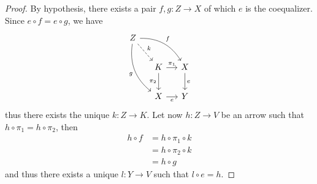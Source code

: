 \documentclass[runningheads,envcountsect]{lipics-v2021}
\newcommand{\cat}[1]{\ensuremath{\mathbf{#1}}}
\begin{document}

\begin{proof}
    By hypothesis, there exists a pair $f, g: Z \to X$ of which $e$ is the coequalizer. Since $e \circ f = e \circ g$, we have
    \[
        \begin{tikzcd}[row sep= 20, column sep = 13]
            Z \ar[drr, "f", bend left=30] \ar[ddr, "g"swap, bend right=30] \ar[dr, dashed, "k"] & & \\
            & K \ar[r, "{\pi_1}"] \ar[d, "{\pi_2}" swap] & X \ar[d, "e"] \\
            & X \ar[r, "e"swap] & Y
        \end{tikzcd}
    \]
    thus there exists the unique $k: Z \to K$. Let now $h: Z \to V$ be an arrow such that $h \circ \pi_1 = h \circ \pi_2$, then
    \begin{align*}
        h \circ f &= h \circ \pi_1 \circ k \\
                  &= h \circ \pi_2 \circ k \\
                  &= h \circ g
    \end{align*}
    and thus there exists a unique $l: Y \to V$ such that $l \circ e = h$.   
\end{proof}

\end{document}
